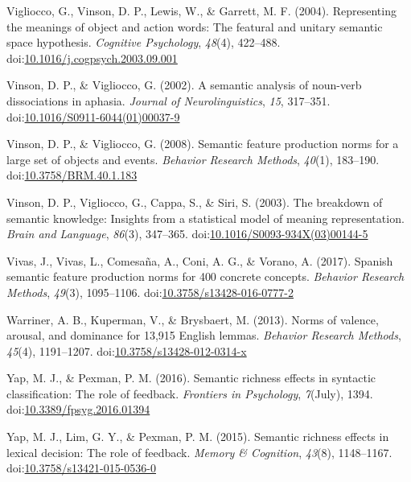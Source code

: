 \documentclass[english,,man]{apa6}
\theoremstyle{definition}
\theoremstyle{definition}
\theoremstyle{definition}
\theoremstyle{remark}
\begin{document}
\hypertarget{ref-Vigliocco2004}{}
Vigliocco, G., Vinson, D. P., Lewis, W., \& Garrett, M. F. (2004).
Representing the meanings of object and action words: The featural and
unitary semantic space hypothesis. \emph{Cognitive Psychology},
\emph{48}(4), 422--488.
doi:\href{https://doi.org/10.1016/j.cogpsych.2003.09.001}{10.1016/j.cogpsych.2003.09.001}

\hypertarget{ref-Vinson2002}{}
Vinson, D. P., \& Vigliocco, G. (2002). A semantic analysis of noun-verb
dissociations in aphasia. \emph{Journal of Neurolinguistics}, \emph{15},
317--351.
doi:\href{https://doi.org/10.1016/S0911-6044(01)00037-9}{10.1016/S0911-6044(01)00037-9}

\hypertarget{ref-Vinson2008}{}
Vinson, D. P., \& Vigliocco, G. (2008). Semantic feature production
norms for a large set of objects and events. \emph{Behavior Research
Methods}, \emph{40}(1), 183--190.
doi:\href{https://doi.org/10.3758/BRM.40.1.183}{10.3758/BRM.40.1.183}

\hypertarget{ref-Vinson2003}{}
Vinson, D. P., Vigliocco, G., Cappa, S., \& Siri, S. (2003). The
breakdown of semantic knowledge: Insights from a statistical model of
meaning representation. \emph{Brain and Language}, \emph{86}(3),
347--365.
doi:\href{https://doi.org/10.1016/S0093-934X(03)00144-5}{10.1016/S0093-934X(03)00144-5}

\hypertarget{ref-Vivas2017}{}
Vivas, J., Vivas, L., Comesaña, A., Coni, A. G., \& Vorano, A. (2017).
Spanish semantic feature production norms for 400 concrete concepts.
\emph{Behavior Research Methods}, \emph{49}(3), 1095--1106.
doi:\href{https://doi.org/10.3758/s13428-016-0777-2}{10.3758/s13428-016-0777-2}

\hypertarget{ref-Warriner2013}{}
Warriner, A. B., Kuperman, V., \& Brysbaert, M. (2013). Norms of
valence, arousal, and dominance for 13,915 English lemmas.
\emph{Behavior Research Methods}, \emph{45}(4), 1191--1207.
doi:\href{https://doi.org/10.3758/s13428-012-0314-x}{10.3758/s13428-012-0314-x}

\hypertarget{ref-Yap2016}{}
Yap, M. J., \& Pexman, P. M. (2016). Semantic richness effects in
syntactic classification: The role of feedback. \emph{Frontiers in
Psychology}, \emph{7}(July), 1394.
doi:\href{https://doi.org/10.3389/fpsyg.2016.01394}{10.3389/fpsyg.2016.01394}

\hypertarget{ref-Yap2015}{}
Yap, M. J., Lim, G. Y., \& Pexman, P. M. (2015). Semantic richness
effects in lexical decision: The role of feedback. \emph{Memory \&
Cognition}, \emph{43}(8), 1148--1167.
doi:\href{https://doi.org/10.3758/s13421-015-0536-0}{10.3758/s13421-015-0536-0}
\end{document}
